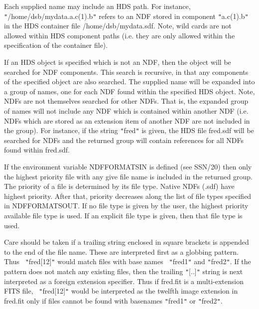 \documentclass[twoside,11pt]{article}
\newcommand{\xref}[3]{#1}
\renewcommand{\_}{\texttt{\symbol{95}}}
\newcommand{\sstitem}{\item}
\newcommand{\sstitem}{\item}
\begin{document}
{{{         \sstitem
         Each supplied name may include an HDS path. For instance,
         {\tt "}/home/dsb/mydata.a.c(1).b{\tt "} refers to an NDF stored in component
         {\tt "}a.c(1).b{\tt "} in the HDS container file /home/dsb/mydata.sdf. Note,
         wild cards are not allowed within HDS component paths (i.e. they
         are only allowed within the specification of the container file).

         \sstitem
         If an HDS object is specified which is not an NDF, then the
         object will be searched for NDF components. This search is
         recursive, in that any components of the specified object are also
         searched. The supplied name will be expanded into a group of names,
         one for each NDF found within the specified HDS object. Note, NDFs
         are not themselves searched for other NDFs. That is, the expanded
         group of names will not include any NDF which is contained within
         another NDF (i.e. NDFs which are stored as an extension item of
         another NDF are not included in the group). For instance, if the
         string {\tt "}fred{\tt "} is given, the HDS file fred.sdf will be searched for
         NDFs and the returned group will contain references for all NDFs
         found within fred.sdf.

         \sstitem
         If the environment variable NDF\_FORMATS\_IN is defined (see
         \xref{SSN/20}{ssn20}{}) then only the highest priority file with any give file name
         is included in the returned group. The priority of a file is
         determined by its file type. Native NDFs (.sdf) have highest
         priority. After that, priority decreases along the list of file
         types specified in NDF\_FORMATS\_OUT. If no file type is given by
         the user, the highest priority available file type is used. If an
         explicit file type is given, then that file type is used.

         \sstitem

         Care should be taken if a trailing string enclosed in square
	 brackets is appended to the end of the file name. These are
	 interpreted first as a globbing pattern. Thus {\tt
	 "}fred[12]{\tt "} would match files with base names {\tt
	 "}fred1{\tt "} and {\tt "}fred2{\tt "}. If the pattern does not
	 match any existing files, then the trailing {\tt "}[..]{\tt "}
	 string is next interpreted as a foreign extension specifier.
	 Thus if fred.fit is a multi-extension FITS file, {\tt
	 "}fred[12]{\tt "} would be interpreted as the twelfth image
	 extension in fred.fit only if files cannot be found with
	 basenames {\tt "}fred1{\tt "} or {\tt "}fred2{\tt "}.

}}}
\end{document}
